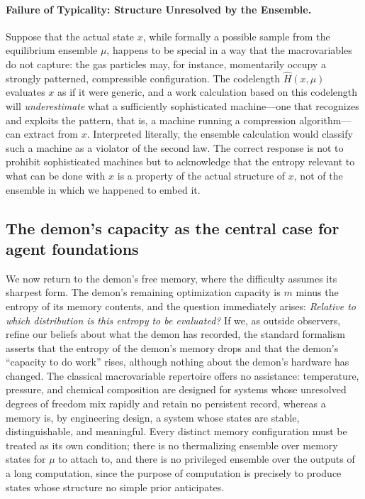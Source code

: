\documentclass[11pt]{article}
\begin{document}
\paragraph{Failure of Typicality: Structure Unresolved by the Ensemble.} Suppose that the actual state $x$, while formally a possible sample from the equilibrium ensemble $\mu$, happens to be special in a way that the macrovariables do not capture: the gas particles may, for instance, momentarily occupy a strongly patterned, compressible configuration. The codelength $\hat H(x,\mu)$ evaluates $x$ as if it were generic, and a work calculation based on this codelength will \emph{underestimate} what a sufficiently sophisticated machine---one that recognizes and exploits the pattern, that is, a machine running a compression algorithm---can extract from $x$. Interpreted literally, the ensemble calculation would classify such a machine as a violator of the second law. The correct response is not to prohibit sophisticated machines but to acknowledge that the entropy relevant to what can be done with $x$ is a property of the actual structure of $x$, not of the ensemble in which we happened to embed it.

\subsection{The demon's capacity as the central case for agent foundations}
\label{sec:centralcase}

We now return to the demon's free memory, where the difficulty assumes its sharpest form. The demon's remaining optimization capacity is $m$ minus the entropy of its memory contents, and the question immediately arises: \emph{Relative to which distribution is this entropy to be evaluated?} If we, as outside observers, refine our beliefs about what the demon has recorded, the standard formalism asserts that the entropy of the demon's memory drops and that the demon's ``capacity to do work'' rises, although nothing about the demon's hardware has changed. The classical macrovariable repertoire offers no assistance: temperature, pressure, and chemical composition are designed for systems whose unresolved degrees of freedom mix rapidly and retain no persistent record, whereas a memory is, by engineering design, a system whose states are stable, distinguishable, and meaningful. Every distinct memory configuration must be treated as its own condition; there is no thermalizing ensemble over memory states for $\mu$ to attach to, and there is no privileged ensemble over the outputs of a long computation, since the purpose of computation is precisely to produce states whose structure no simple prior anticipates.
\end{document}
